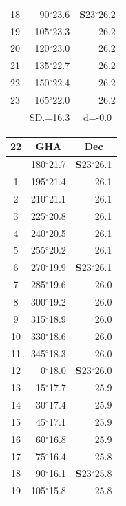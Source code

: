 \documentclass[10pt, a4paper]{report}
\begin{document}
\begin{scriptsize}
\begin{tabular*}{0.2\textwidth}[t]{@{\extracolsep{\fill}}|c|rr|}
18 & 90$^\circ$23.6 & \textbf{S}23$^\circ$26.2\\
19 & 105$^\circ$23.3 & 26.2\\
20 & 120$^\circ$23.0 & 26.2\\
21 & 135$^\circ$22.7 & \raisebox{0.24ex}{\boldmath$\cdot$~\boldmath$\cdot$~~}26.2\\
22 & 150$^\circ$22.4 & 26.2\\
23 & 165$^\circ$22.0 & 26.2\\
\hline
\rule{0pt}{2.4ex} & \multicolumn{1}{c}{SD.=16.3} & \multicolumn{1}{c|}{d=-0.0}\\
\hline
\end{tabular*}\noindent
\begin{tabular*}{0.2\textwidth}[t]{@{\extracolsep{\fill}}|c|rr|}
\hline
\multicolumn{1}{|c|}{\rule{0pt}{2.6ex}\textbf{22}} & \multicolumn{1}{c}{\textbf{GHA}} & \multicolumn{1}{c|}{\textbf{Dec}}\\
\hline\rule{0pt}{2.6ex}\noindent
0 & 180$^\circ$21.7 & \textbf{S}23$^\circ$26.1\\
1 & 195$^\circ$21.4 & 26.1\\
2 & 210$^\circ$21.1 & 26.1\\
3 & 225$^\circ$20.8 & \raisebox{0.24ex}{\boldmath$\cdot$~\boldmath$\cdot$~~}26.1\\
4 & 240$^\circ$20.5 & 26.1\\
5 & 255$^\circ$20.2 & 26.1\\[2Pt]
6 & 270$^\circ$19.9 & \textbf{S}23$^\circ$26.1\\
7 & 285$^\circ$19.6 & 26.0\\
8 & 300$^\circ$19.2 & 26.0\\
9 & 315$^\circ$18.9 & \raisebox{0.24ex}{\boldmath$\cdot$~\boldmath$\cdot$~~}26.0\\
10 & 330$^\circ$18.6 & 26.0\\
11 & 345$^\circ$18.3 & 26.0\\[2Pt]
12 & 0$^\circ$18.0 & \textbf{S}23$^\circ$26.0\\
13 & 15$^\circ$17.7 & 25.9\\
14 & 30$^\circ$17.4 & 25.9\\
15 & 45$^\circ$17.1 & \raisebox{0.24ex}{\boldmath$\cdot$~\boldmath$\cdot$~~}25.9\\
16 & 60$^\circ$16.8 & 25.9\\
17 & 75$^\circ$16.4 & 25.8\\[2Pt]
18 & 90$^\circ$16.1 & \textbf{S}23$^\circ$25.8\\
19 & 105$^\circ$15.8 & 25.8\\

\end{tabular*}
\end{scriptsize}
\end{document}
